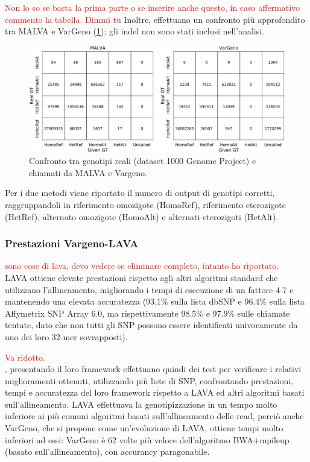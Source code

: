 \documentclass[../main.tex]{subfiles}
\begin{document}
\noindent
\textcolor{red}{Non lo so se basta la prima parte o se inserire anche questo, in caso affermativo commento la tabella. Dimmi tu}
Inoltre, \cite{bernardini2019malva} effettuano un confronto più approfondito tra MALVA e VarGeno (\ref{fig:confronto3}); gli indel non sono stati inclusi nell'analisi.

\begin{figure}[h!]
	\centering
  	\captionsetup{justification=centering}
  	\includegraphics{images/confronto3.jpg}
  	\caption{Confronto tra genotipi reali (dataset 1000 Genome Project) e chiamati da MALVA e Vargeno.}
  	\label{fig:confronto3}
\end{figure}


Per i due metodi viene riportato il numero di output di genotipi corretti, raggruppandoli in riferimento omozigote (HomoRef), riferimento eterozigote (HetRef), alternato omozigote (HomoAlt) e alternati eterozigoti (HetAlt). 


\subsubsection{Prestazioni Vargeno-LAVA}

\textcolor{red}{sono cose di lava, devo vedere se eliminare completo, intanto ho riportato.\\}
LAVA ottiene elevate prestazioni rispetto agli altri algoritmi standard che utilizzano l'allineamento, migliorando i tempi di esecuzione di un fattore 4-7 e mantenendo una elevata accuratezza (93.1\% sulla lista dbSNP e 96.4\% sulla lista Affymetrix SNP Array 6.0, ma rispettivamente 98.5\% e 97.9\% sulle chiamate tentate, dato che non tutti gli SNP possono essere identificati univocamente da uno dei loro 32-mer sovrapposti).

\textcolor{red}{Va ridotto.\\}
\cite{sun-medvedev2018vargeno}, presentando il loro framework effettuano quindi dei test per verificare i relativi miglioramenti ottenuti, utilizzando più liste di SNP, confrontando prestazioni, tempi e accuratezza del loro framework rispetto a LAVA ed altri algoritmi basati sull'allineamento. LAVA effettuava la genotipizzazione in un tempo molto inferiore ai più comuni algoritmi basati sull'allineamento delle read, perciò anche VarGeno, che si propone come un'evoluzione di LAVA, ottiene tempi molto inferiori ad essi: VarGeno è 62 volte più veloce dell'algoritmo BWA+mpileup (basato sull'allineamento), con accurancy paragonabile. 
\end{document}
